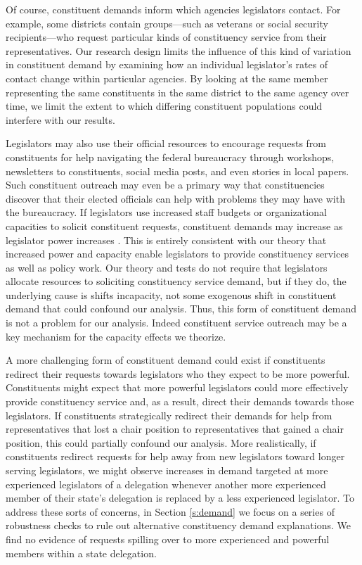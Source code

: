 \documentclass[12pt]{article}
\begin{document}
{Of course, constituent demands inform which agencies legislators contact. For example, some districts contain groups---such as veterans or social security recipients---who request particular kinds of constituency service from their representatives. Our research design limits the influence of this kind of variation in constituent demand by examining how an individual legislator's rates of contact change within particular agencies. By looking at the same member representing the same constituents in the same district to the same agency over time, we limit the extent to which differing constituent populations could interfere with our results. 

Legislators may also use their official resources to encourage requests from constituents for help navigating the federal bureaucracy through workshops, newsletters to constituents, social media posts, and even stories in local papers. 
Such constituent outreach may even be a primary way that constituencies discover that their elected officials can help with problems they may have with the bureaucracy. If legislators use increased staff budgets or organizational capacities to solicit constituent requests, constituent demands may increase as legislator power increases \citep{CainFerejohnFiorina1987}.  %
This is entirely consistent with our theory that increased power and capacity enable legislators to provide constituency services as well as policy work. Our theory and tests do not require that legislators allocate resources to soliciting constituency service demand, but if they do, the underlying cause is shifts incapacity, not some exogenous shift in constituent demand that could confound our analysis. Thus, this form of constituent demand is not a problem for our analysis. Indeed constituent service outreach may be a key mechanism for the capacity effects we theorize.

A more challenging form of constituent demand could exist if constituents redirect their requests towards legislators who they expect to be more powerful. Constituents might expect that more powerful legislators could more effectively provide constituency service and, as a result, direct their demands towards those legislators. If constituents strategically redirect their demands for help from representatives that lost a chair position to representatives that gained a chair position, this could partially confound our analysis. More realistically, if constituents redirect requests for help away from new legislators toward longer serving legislators, we might observe increases in demand targeted at more experienced legislators of a delegation whenever another more experienced member of their state's delegation is replaced by a less experienced legislator.  
To address these sorts of concerns, in Section \ref{s:demand} we focus on a series of robustness checks to rule out alternative constituency demand explanations. We find no evidence of requests spilling over to more experienced and powerful members within a state delegation.   

}
\end{document}
